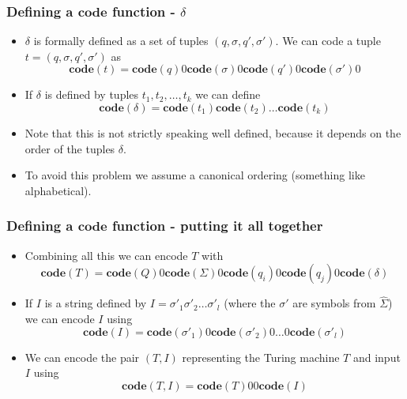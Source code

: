 \documentclass[handout]{beamer}
\newcommand{\co}{\mathbf{code}}
\begin{document}
\begin{frame}
\frametitle{Defining a $\co$ function - $\delta$}
\begin{itemize}
\item $\delta$ is formally defined as a set of tuples $(q,\sigma,q',\sigma')$. We can code a tuple $t=(q,\sigma,q',\sigma')$ as 
\begin{equation*}\co(t)=\co(q)0\co(\sigma)0\co(q')0\co(\sigma')0\end{equation*} 
\vspace{0.2cm}
\item If $\delta$ is defined by tuples $t_1,t_2,\ldots,t_k$ we can define 
\begin{equation*}\co(\delta)=\co(t_1)\co(t_2)\ldots \co(t_k)\end{equation*}
\vspace{0.2cm}
\item Note that this is not strictly speaking well defined, because it depends on the order of the tuples $\delta$.
\vspace{0.2cm}
\item To avoid this problem we assume a canonical ordering (something like alphabetical).
\end{itemize}
\end{frame}

\begin{frame}
\frametitle{Defining a $\co$ function - putting it all together}
\begin{itemize}
\item Combining all this we can encode $T$ with 
\begin{equation*}\co(T)= \co(Q)0\co(\Sigma)0\co(q_i)0\co(q_j)0\co(\delta)\end{equation*}
\vspace{0.2cm}
\item If $I$ is a string defined by $I=\sigma'_1\sigma'_2\ldots\sigma'_l$ (where the $\sigma'$ are symbols from $\hat{\Sigma}$) we can encode $I$ using 
\begin{equation*}\co(I)=\co(\sigma'_1)0\co(\sigma'_2)0\ldots 0\co(\sigma'_l)\end{equation*}
\vspace{0.2cm}
\item We can encode the pair $(T,I)$ representing the Turing machine $T$ and input $I$ using 
\begin{equation*}\co(T,I)=\co(T)00\co(I)\end{equation*}
\end{itemize}
\end{frame}
\end{document}
